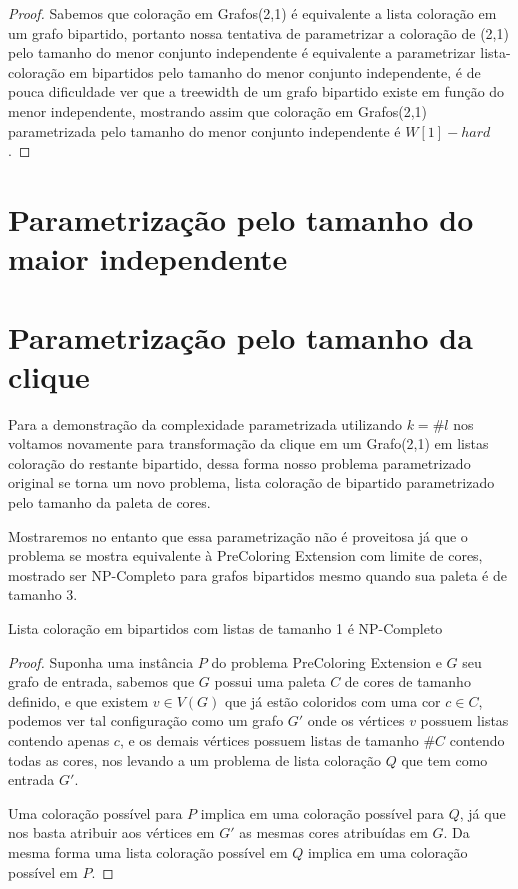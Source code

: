 \begin{proof}
	Sabemos que coloração em Grafos(2,1) é equivalente a lista coloração em um grafo bipartido, portanto nossa tentativa de parametrizar a coloração de (2,1) pelo tamanho do menor conjunto independente é equivalente a parametrizar lista-coloração em bipartidos pelo tamanho do menor conjunto independente, é de pouca dificuldade ver que a treewidth de um grafo bipartido existe em função do menor independente, mostrando assim que coloração em Grafos(2,1) parametrizada pelo tamanho do menor conjunto independente é $W[1]-hard$. 
	
\end{proof}

\section{Parametrização pelo tamanho do maior independente}

\section{Parametrização pelo tamanho da clique}

Para a demonstração da complexidade parametrizada utilizando $k=\#l$ nos voltamos novamente para transformação da clique em um Grafo(2,1) em listas coloração do restante bipartido, dessa forma nosso problema parametrizado original se torna um novo problema, lista coloração de bipartido parametrizado pelo tamanho da paleta de cores. 

Mostraremos no entanto que essa parametrização não é proveitosa já que o problema se mostra equivalente à PreColoring Extension com limite de cores, mostrado ser NP-Completo para grafos bipartidos mesmo quando sua paleta é de tamanho 3\cite{kratochvil94}.

\begin{teorema}
	Lista coloração em bipartidos com listas de tamanho 1 é NP-Completo
\end{teorema}
\begin{proof}
	Suponha uma instância $P$ do problema PreColoring Extension e $G$ seu grafo de entrada, sabemos que $G$ possui uma paleta $C$ de cores de tamanho definido, e que existem $v \in V(G)$ que já estão coloridos com uma cor $c \in C$, podemos ver tal configuração como um grafo $G'$ onde os vértices $v$ possuem listas contendo apenas $c$, e os demais vértices possuem listas de tamanho $\#C$ contendo todas as cores, nos levando a um problema de lista coloração $Q$ que tem como entrada $G'$.
	
	Uma coloração possível para $P$ implica em uma coloração possível para $Q$, já que nos basta atribuir aos vértices em $G'$ as mesmas cores atribuídas em $G$. Da mesma forma uma lista coloração possível em $Q$ implica em uma coloração possível em $P$.
\end{proof}


